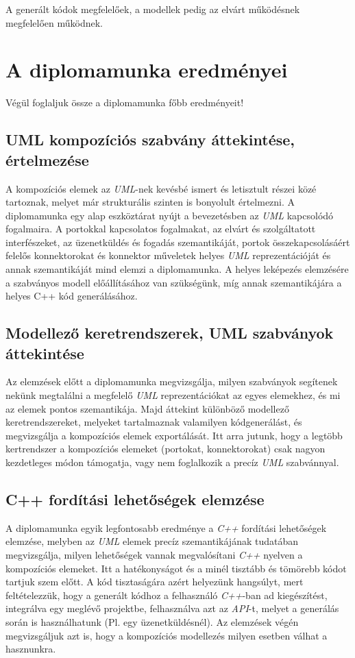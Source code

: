 \documentclass[a4paper,12pt]{report}
\begin{document}
A generált kódok megfelelőek, a modellek pedig az elvárt működésnek megfelelően működnek.

\chapter{A diplomamunka eredményei}
Végül foglaljuk össze a diplomamunka főbb eredményeit!
\section{UML kompozíciós szabvány áttekintése, értelmezése}
A kompozíciós elemek az \textit{UML}-nek kevésbé ismert és letisztult részei közé tartoznak, melyet már strukturális szinten is bonyolult értelmezni. A diplomamunka egy alap eszköztárat nyújt a bevezetésben az \textit{UML} kapcsolódó fogalmaira. A portokkal kapcsolatos fogalmakat, az elvárt és szolgáltatott interfészeket, az üzenetküldés és fogadás szemantikáját, portok összekapcsolásáért felelős konnektorokat és konnektor műveletek helyes \textit{UML} reprezentációját és annak szemantikáját mind elemzi a diplomamunka. A helyes leképezés elemzésére a szabványos modell előállításához van szükségünk, míg annak szemantikájára a helyes C++ kód generálásához.

\section{Modellező keretrendszerek, UML szabványok áttekintése}
Az elemzések előtt a diplomamunka megvizsgálja, milyen szabványok segítenek nekünk megtalálni a megfelelő \textit{UML} reprezentációkat az egyes elemekhez, és mi az elemek pontos szemantikája. Majd áttekint különböző modellező keretrendszereket, melyeket tartalmaznak valamilyen kódgenerálást, és megvizsgálja a kompozíciós elemek exportálását. Itt arra jutunk, hogy a legtöbb kertrendszer a kompozíciós elemeket (portokat, konnektorokat) csak nagyon kezdetleges módon támogatja, vagy nem foglalkozik a precíz \textit{UML} szabvánnyal.

\section{C++ fordítási lehetőségek elemzése}
A diplomamunka egyik legfontosabb eredménye a \textit{C++} fordítási lehetőségek elemzése, melyben az \textit{UML} elemek precíz szemantikájának tudatában megvizsgálja, milyen lehetőségek vannak megvalósítani \textit{C++} nyelven a kompozíciós elemeket. Itt a hatékonyságot és a minél tisztább és tömörebb kódot tartjuk szem előtt. A kód tisztaságára azért helyezünk hangsúlyt, mert feltételezzük, hogy a generált kódhoz a felhasználó \textit{C++}-ban ad kiegészítést, integrálva egy meglévő projektbe, felhasználva azt az \textit{API}-t, melyet a generálás során is használhatunk (Pl. egy üzenetküldésnél). Az elemzések végén megvizsgáljuk azt is, hogy a kompozíciós modellezés milyen esetben válhat a hasznunkra.
\end{document}
